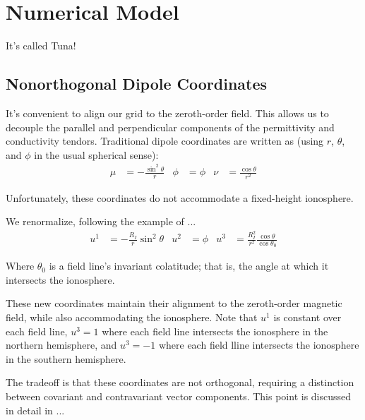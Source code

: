 
\chapter{Numerical Model}
\label{model_chapter}

It's called Tuna! 

\section{Nonorthogonal Dipole Coordinates}

It's convenient to align our grid to the zeroth-order field. This allows us to decouple the parallel and perpendicular components of the permittivity and conductivity tendors. Traditional dipole coordinates are written as (using $r$, $\theta$, and $\phi$ in the usual spherical sense): 
\begin{align}
  \mu & = -\frac{\sin^2 \theta}{r} & \phi & = \phi & \nu & = \frac{\cos \theta}{r^2}
\end{align}

Unfortunately, these coordinates do not accommodate a fixed-height ionosphere. 

We renormalize, following the example of ... 
\begin{align}
  u^1 & = - \frac{R_I}{r} \sin^2 \theta & u^2 & = \phi & u^3 & = \frac{R_I^2}{r^2} \frac{\cos \theta}{\cos \theta_0}
\end{align}

Where $\theta_0$ is a field line's invariant colatitude; that is, the angle at which it intersects the ionosphere. 

These new coordinates maintain their alignment to the zeroth-order magnetic field, while also accommodating the ionosphere. Note that $u^1$ is constant over each field line, $u^3 = 1$ where each field line intersects the ionosphere in the northern hemisphere, and $u^3 = -1$ where each field lline intersects the ionosphere in the southern hemisphere. 

The tradeoff is that these coordinates are not orthogonal, requiring a distinction between covariant and contravariant vector components. This point is discussed in detail in ...

